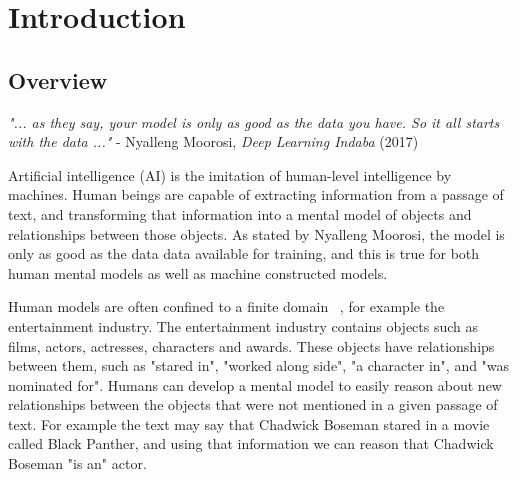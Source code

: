
\chapter{Introduction}  %

\ifpdf
     \graphicspath{{Figs/Chapter1/}}
\else
    \graphicspath{{Chapter1/Figs/Vector/}{Chapter1/Figs/}}
\fi



\section{Overview} %

\emph{"... as they say, your model is only as good as the data you have. \newline So it all starts with the data ..."} \newline
\indent \indent - Nyalleng Moorosi, \emph{Deep Learning Indaba} (2017) \par

\smallskip

\noindent Artificial intelligence (AI) is the imitation of human-level intelligence by machines. Human beings are capable of extracting information from a passage of text, and transforming that information into a mental model of objects and relationships between those objects. As stated by Nyalleng Moorosi, the model is only as good as the data data available for training, and this is true for both human mental models as well as machine constructed models. \par

\noindent Human models are often confined to a finite domain \unskip~\citep{staab2010handbook}, for example the entertainment industry. The entertainment industry contains objects such as films, actors, actresses, characters and awards. These objects have relationships between them, such as "stared in", "worked along side", "a character in", and "was nominated for". Humans can develop a mental model to easily reason about new relationships between the objects that were not mentioned in a given passage of text. For example the text may say that Chadwick Boseman stared in a movie called Black Panther, and using that information we can reason that Chadwick Boseman "is an" actor. \par

